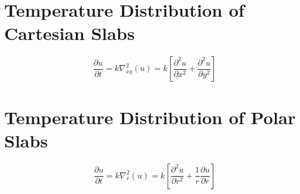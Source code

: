 \chapter{Temperature Distribution of Cartesian Slabs}
\begin{comment}
Physics Archives
\end{comment}
$$\frac{\partial u}{\partial t} = k\nabla^2_{xy}(u) = k\left[\frac{\partial^2 u}{\partial x^2} + \frac{\partial^2 u}{\partial y^2}\right]$$
\chapter{Temperature Distribution of Polar Slabs}
\begin{comment}
Physics Archives
\end{comment}
$$\frac{\partial u}{\partial t} = k\nabla^2_{r}(u) = k\left[\frac{\partial^2 u}{\partial r^2} + \frac{1}{r}\frac{\partial u}{\partial r}\right]$$
